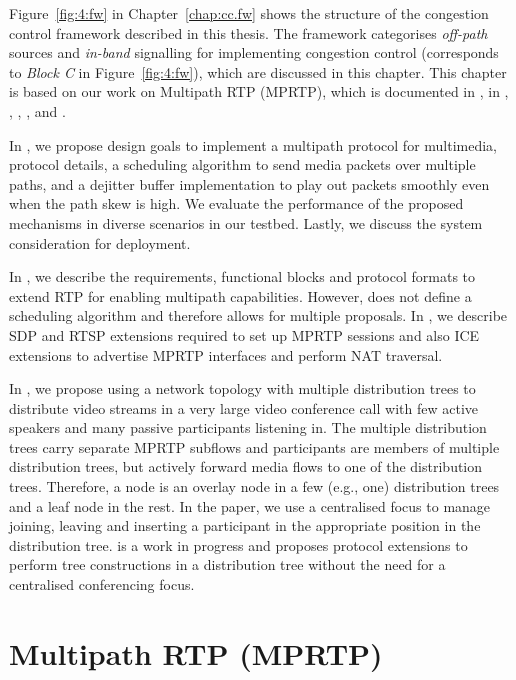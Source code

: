 Figure~\ref{fig:4:fw} in Chapter~\ref{chap:cc.fw} shows the structure of the
congestion control framework described in this thesis. The framework
categorises \emph{off-path} sources and \emph{in-band} signalling for
implementing congestion control (corresponds to \emph{Block C} in
Figure~\ref{fig:4:fw}), which are discussed in this chapter. This chapter is
based on our work on Multipath RTP (MPRTP), which is documented in
, in \cite{draft.mprtp}, \cite{draft.mprtp.sdp},
\cite{draft.mmusic.pcp.best.int}, \cite{Globisch:AsymGrpComm}, and 
\cite{draft.rtcp.overlay}.

In , we propose design goals to implement a
multipath protocol for multimedia, protocol details, a scheduling algorithm to
send media packets over multiple paths, and a dejitter buffer implementation to
play out packets smoothly even when the path skew is high. We evaluate the
performance of the proposed mechanisms in diverse scenarios in our testbed.
Lastly, we discuss the system consideration for deployment.

In \cite{draft.mprtp}, we describe the requirements, functional blocks and
protocol formats to extend RTP for enabling multipath capabilities. However,
\cite{draft.mprtp} does not define a scheduling algorithm and therefore allows 
for multiple proposals. In \cite{draft.mprtp.sdp}, we describe SDP and RTSP 
extensions required to set up MPRTP sessions and also ICE extensions to advertise 
MPRTP interfaces and perform NAT traversal.

In \cite{Globisch:AsymGrpComm}, we propose using a network topology with
multiple distribution trees to distribute video streams in a very large
video conference call with few active speakers and many passive participants
listening in. The multiple distribution trees carry separate MPRTP subflows
and participants are members of multiple distribution trees, but actively
forward media flows to one of the distribution trees. Therefore, a node is an
overlay node in a few (e.g., one) distribution trees and a leaf node in the
rest. In the paper, we use a centralised focus to manage joining, leaving
and inserting a participant in the appropriate position in the distribution
tree. \cite{draft.rtcp.overlay} is a work in progress and proposes protocol
extensions to perform tree constructions in a distribution tree without the
need for a centralised conferencing focus.


\section{Multipath RTP (MPRTP)}

